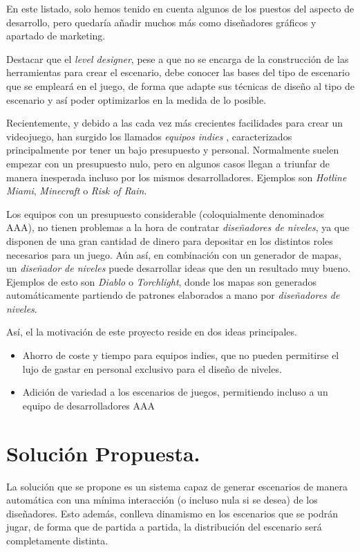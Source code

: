 En este listado, solo hemos tenido en cuenta algunos de los puestos del aspecto de desarrollo, pero quedaría añadir muchos más como diseñadores gráficos y apartado de marketing.

Destacar que el \emph{level designer}, pese a que no se encarga de la construcción de las herramientas para crear el escenario, debe conocer las bases del tipo de escenario que se empleará en el juego, de forma que adapte sus técnicas de diseño al tipo de escenario y así poder optimizarlos en la medida de lo posible.

Recientemente, y debido a las cada vez más crecientes facilidades para crear un videojuego, han surgido los llamados \emph{equipos indies} \cite{gdindie}, caracterizados principalmente por tener un bajo presupuesto y personal. Normalmente suelen empezar con un presupuesto nulo, pero en algunos casos llegan a triunfar de manera inesperada incluso por los mismos desarrolladores. Ejemplos son \emph{Hotline Miami}, \emph{Minecraft} o \emph{Risk of Rain}.

Los equipos con un presupuesto considerable (coloquialmente denominados AAA), no tienen problemas a la hora de contratar \emph{diseñadores de niveles}, ya que disponen de una gran cantidad de dinero para depositar en los distintos roles necesarios para un juego. Aún así, en combinación con un generador de mapas, un \emph{diseñador de niveles} puede desarrollar ideas que den un resultado muy bueno. Ejemplos de esto son \emph{Diablo} o \emph{Torchlight}, donde los mapas son generados automáticamente partiendo de patrones elaborados a mano por \emph{diseñadores de niveles}.

Así, el la motivación de este proyecto reside en dos ideas principales.

\begin{itemize}
	\item Ahorro de coste y tiempo para equipos indies, que no pueden permitirse el lujo de gastar en personal exclusivo para el diseño de niveles.
	\item Adición de variedad a los escenarios de juegos, permitiendo incluso a un equipo de desarrolladores AAA
\end{itemize}


\section*{Solución Propuesta.}

La solución que se propone es un sistema capaz de generar escenarios de manera automática con una mínima interacción (o incluso nula si se desea) de los diseñadores. Esto además, conlleva dinamismo en los escenarios que se podrán jugar, de forma que de partida a partida, la distribución del escenario será completamente distinta.

